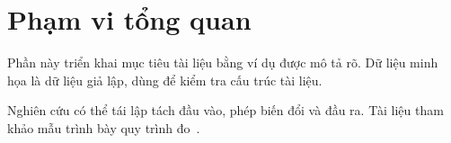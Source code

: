 \section{Phạm vi tổng quan}


\label{sec:chapter1}
Phần này triển khai mục tiêu tài liệu bằng ví dụ được mô tả rõ. Dữ liệu minh họa là dữ liệu giả lập, dùng để kiểm tra cấu trúc tài liệu.

Nghiên cứu có thể tái lập tách đầu vào, phép biến đổi và đầu ra. Tài liệu tham khảo mẫu trình bày quy trình đo~\cite{example}.
